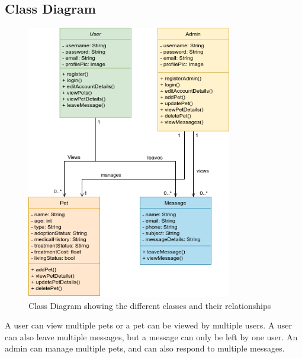 \subsection{Class Diagram}
\begin{figure}[H]
    \centering
    \includegraphics[width=0.8\textwidth]{images/classDiagram.png}
    \caption{Class Diagram showing the different classes and their relationships}
\end{figure}
A user can view multiple pets or a pet can be viewed by multiple users. A user can also leave multiple messages, but a message can only be left by one user. An admin can manage multiple pets, and can also respond to multiple messages.

